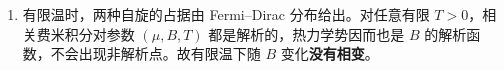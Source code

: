\begin{question}
\begin{solution}
\begin{enumerate}[label=(\arabic*),leftmargin=2.5em]
  \item 有限温时，两种自旋的占据由 Fermi--Dirac 分布给出。对任意有限 $T>0$，相关费米积分对参数 $(\mu,B,T)$ 都是解析的，热力学势因而也是 $B$ 的解析函数，不会出现非解析点。故有限温下随 $B$ 变化\textbf{没有相变}。
\end{enumerate}
\end{solution}
\end{question}

